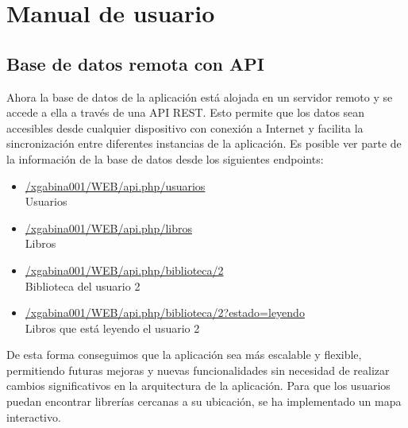 \documentclass[a4paper,11pt]{report}
\begin{document}
  \chapter{Manual de usuario}
    \section{Base de datos remota con API}
      Ahora la base de datos de la aplicación está alojada en un servidor remoto y se accede a ella a través de una API REST. Esto permite que los datos sean accesibles desde cualquier dispositivo con conexión a Internet y facilita la sincronización entre diferentes instancias de la aplicación.
      Es posible ver parte de la información de la base de datos desde los siguientes endpoints:
      \begin{itemize}
        \item \href{http://ec2-51-44-167-78.eu-west-3.compute.amazonaws.com/xgabina001/WEB/api.php/usuarios}{/xgabina001/WEB/api.php/usuarios} \\Usuarios
        \item \href{http://ec2-51-44-167-78.eu-west-3.compute.amazonaws.com/xgabina001/WEB/api.php/libros}{/xgabina001/WEB/api.php/libros} \\Libros
        \item \href{http://ec2-51-44-167-78.eu-west-3.compute.amazonaws.com/xgabina001/WEB/api.php/biblioteca/2}{/xgabina001/WEB/api.php/biblioteca/2} \\Biblioteca del usuario 2
        \item \href{http://ec2-51-44-167-78.eu-west-3.compute.amazonaws.com/xgabina001/WEB/api.php/biblioteca/2?estado=leyendo}{/xgabina001/WEB/api.php/biblioteca/2?estado=leyendo} \\Libros que está leyendo el usuario 2
      \end{itemize}
      De esta forma conseguimos que la aplicación sea más escalable y flexible, permitiendo futuras mejoras y nuevas funcionalidades sin necesidad de realizar cambios significativos en la arquitectura de la aplicación.
      Para que los usuarios puedan encontrar librerías cercanas a su ubicación, se ha implementado un mapa interactivo.
\end{document}
